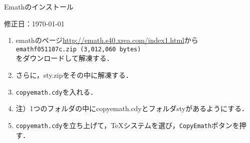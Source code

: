 \documentclass{ujarticle}
\begin{document}
\begin{center}
Emathのインストール
\end{center}

\vspace{-5mm}

\hfill 修正日：\today

\begin{enumerate}[\bf\large 1.]
\item emathのページ\url{http://emath.s40.xrea.com/index1.html}から\\
\hspace*{4zw}\verb|emathf051107c.zip (3,012,060 bytes)|\\
をダウンロードして解凍する．
\item さらに，sty.zipをその中に解凍する．
\item \verb|copyemath.cdy|を入れる．

\item[]\hspace*{1zw}注）1つのフォルダの中にcopyemath.cdyとフォルダstyがあるようにする．


\item \verb|copyemath.cdy|を立ち上げて，TeXシステムを選び，\verb|CopyEmath|ボタンを押す．
\end{enumerate}
\end{document}
